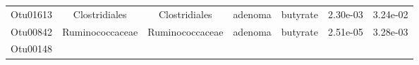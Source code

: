 \documentclass[11pt,]{article}
\begin{document}
\begin{longtable}[]{@{}ccccccc@{}}
\begin{minipage}[t]{0.09\columnwidth}\centering\strut
Otu01613\strut
\end{minipage} & \begin{minipage}[t]{0.17\columnwidth}\centering\strut
Clostridiales\strut
\end{minipage} & \begin{minipage}[t]{0.17\columnwidth}\centering\strut
Clostridiales\strut
\end{minipage} & \begin{minipage}[t]{0.09\columnwidth}\centering\strut
adenoma\strut
\end{minipage} & \begin{minipage}[t]{0.11\columnwidth}\centering\strut
butyrate\strut
\end{minipage} & \begin{minipage}[t]{0.09\columnwidth}\centering\strut
2.30e-03\strut
\end{minipage} & \begin{minipage}[t]{0.09\columnwidth}\centering\strut
3.24e-02\strut
\end{minipage}\tabularnewline
\begin{minipage}[t]{0.09\columnwidth}\centering\strut
Otu00842\strut
\end{minipage} & \begin{minipage}[t]{0.17\columnwidth}\centering\strut
Ruminococcaceae\strut
\end{minipage} & \begin{minipage}[t]{0.17\columnwidth}\centering\strut
Ruminococcaceae\strut
\end{minipage} & \begin{minipage}[t]{0.09\columnwidth}\centering\strut
adenoma\strut
\end{minipage} & \begin{minipage}[t]{0.11\columnwidth}\centering\strut
butyrate\strut
\end{minipage} & \begin{minipage}[t]{0.09\columnwidth}\centering\strut
2.51e-05\strut
\end{minipage} & \begin{minipage}[t]{0.09\columnwidth}\centering\strut
3.28e-03\strut
\end{minipage}\tabularnewline
\begin{minipage}[t]{0.09\columnwidth}\centering\strut
Otu00148\strut
\end{minipage} & \begin{minipage}[t]{0.17\columnwidth}\centering\strut

\end{minipage}
\end{longtable}
\end{document}
